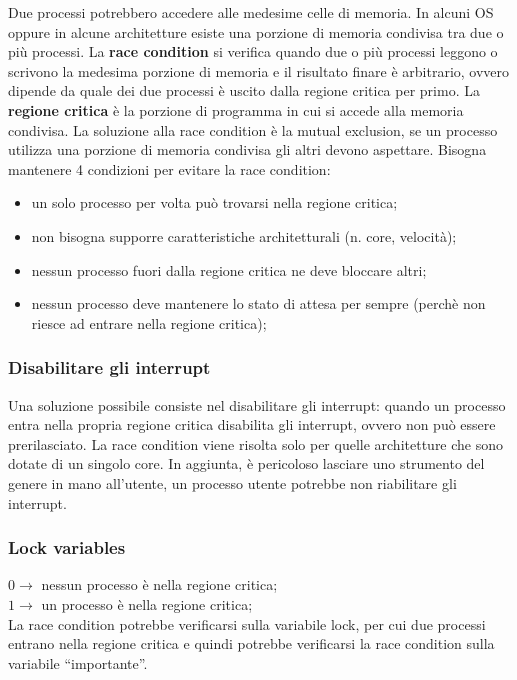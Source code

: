 \documentclass{article}
\begin{document}
Due processi potrebbero accedere alle medesime celle di memoria. In alcuni OS oppure in alcune architetture esiste una porzione di memoria condivisa tra due o più processi. La \textbf{race condition} si verifica quando due o più processi leggono o scrivono la medesima porzione di memoria e il risultato finare è arbitrario, ovvero dipende da quale dei due processi è uscito dalla regione critica per primo. La \textbf{regione critica} è la porzione di programma in cui si accede alla memoria condivisa. La soluzione alla race condition è la mutual exclusion, se un processo utilizza una porzione di memoria condivisa gli altri devono aspettare. Bisogna mantenere 4 condizioni per evitare la race condition:
\begin{itemize}
  \item un solo processo per volta può trovarsi nella regione critica;

  \item non bisogna supporre caratteristiche architetturali (n. core, velocità);

  \item nessun processo fuori dalla regione critica ne deve bloccare altri;

  \item nessun processo deve mantenere lo stato di attesa per sempre (perchè non riesce ad entrare nella regione critica);
\end{itemize}

\subsubsection{Disabilitare gli interrupt}
Una soluzione possibile consiste nel disabilitare gli interrupt: quando un processo entra nella propria regione critica disabilita gli interrupt, ovvero non può essere prerilasciato. La race condition viene risolta solo per quelle architetture che sono dotate di un singolo core. In aggiunta, è pericoloso lasciare uno strumento del genere in mano all'utente, un processo utente potrebbe non riabilitare gli interrupt.

\subsubsection{Lock variables}
$0 \rightarrow$ nessun processo è nella regione critica;\\
$1 \rightarrow$ un processo è nella regione critica;\\
La race condition potrebbe verificarsi sulla variabile lock, per cui due processi entrano nella regione critica e quindi potrebbe verificarsi la race condition sulla variabile ``importante''.
\end{document}
